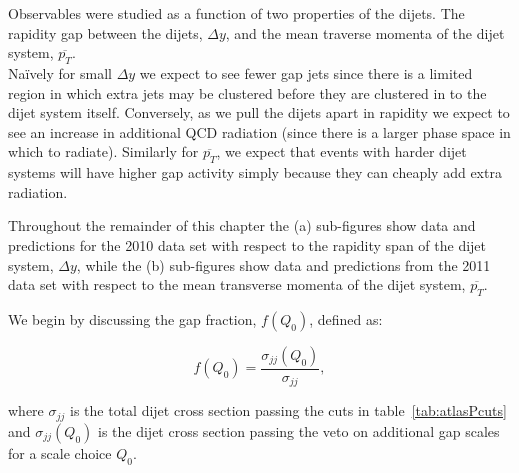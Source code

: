 	Observables were studied
	as a function of two properties of the dijets.  The rapidity gap between the dijets,
	$\Delta y$, and the mean traverse momenta of the dijet system, $\overline{p_T}$.\\
	Na\"ively for small $\Delta y$ we expect to see fewer gap jets since there is
	a limited region in which extra jets may be clustered before they are clustered in
	to the dijet system itself.   Conversely, as we pull the dijets apart in rapidity
	we expect to see an increase in additional QCD radiation (since there is a larger
	phase space in which to radiate).  Similarly for $\overline{p_T}$, we expect that
	events with harder dijet systems will have higher gap activity simply because they
	can cheaply add extra radiation.

	Throughout the remainder of this chapter the (a) sub-figures show data and
	predictions for the 2010 data set with respect to the rapidity span of the dijet
	system, $\Delta y$, while the (b) sub-figures show data and predictions from the
	2011 data set with respect to the mean transverse momenta of the dijet system,
	$\overline{p_T}$.

	We begin by discussing the gap fraction, $f(Q_0)$, defined as:

	\begin{equation}
		f(Q_0) = \frac{\sigma_{jj}(Q_0)}{\sigma_{jj}},
	\end{equation}

	where $\sigma_{jj}$ is the total dijet cross section passing the cuts in
	table~\ref{tab:atlasPcuts} and $\sigma_{jj}(Q_0)$ is the dijet cross section passing
	the veto on additional gap scales for a scale choice $Q_0$.

